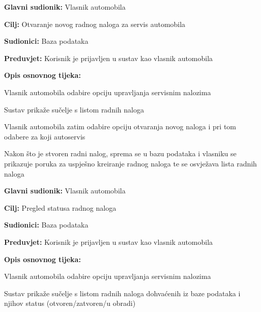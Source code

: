 \noindent {}
\begin{packed_item}

	\item \textbf{Glavni sudionik: } Vlasnik automobila
	\item  \textbf{Cilj:} Otvaranje novog radnog naloga za servis automobila
	\item  \textbf{Sudionici:} Baza podataka
	\item  \textbf{Preduvjet:} Korisnik je prijavljen u sustav kao vlasnik automobila
	\item  \textbf{Opis osnovnog tijeka:}

	\item[] \begin{packed_enum}

		\item Vlasnik automobila odabire opciju upravljanja servisnim nalozima
		\item Sustav prikaže sučelje s listom radnih naloga
		\item Vlasnik automobila zatim odabire opciju otvaranja novog naloga i pri
		tom odabere za koji autoservis
		\item Nakon što je stvoren radni nalog, sprema se u bazu podataka i vlasniku se prikazuje poruka za uspješno kreiranje radnog naloga te se osvježava lista radnih naloga

	\end{packed_enum}
\end{packed_item}

\noindent {}
\begin{packed_item}

	\item \textbf{Glavni sudionik: } Vlasnik automobila
	\item  \textbf{Cilj:} Pregled statusa radnog naloga
	\item  \textbf{Sudionici:} Baza podataka
	\item  \textbf{Preduvjet:} Korisnik je prijavljen u sustav kao vlasnik automobila
	\item  \textbf{Opis osnovnog tijeka:}

	\item[] \begin{packed_enum}

		\item Vlasnik automobila odabire opciju upravljanja servisnim nalozima
		\item Sustav prikaže sučelje s listom radnih naloga dohvaćenih iz baze podataka i njihov status
		(otvoren/zatvoren/u obradi)

	\end{packed_enum}
\end{packed_item}

